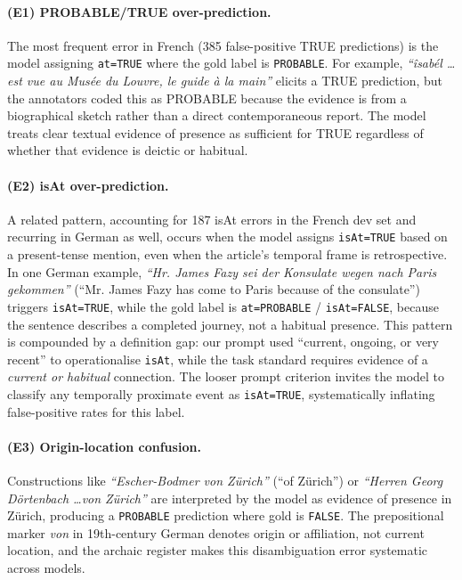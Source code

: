 \documentclass[
]{ceurart}
\theoremstyle{definition}
\begin{document}
\paragraph{(E1) PROBABLE/TRUE over-prediction.}
The most frequent error in French (385 false-positive TRUE predictions) is the model assigning \texttt{at=TRUE} where the gold label is \texttt{PROBABLE}.
For example, \textit{``îsabél \ldots est vue au Musée du Louvre, le guide à la main''} elicits a TRUE prediction, but the annotators coded this as PROBABLE because the evidence is from a biographical sketch rather than a direct contemporaneous report.
The model treats clear textual evidence of presence as sufficient for TRUE regardless of whether that evidence is deictic or habitual.

\paragraph{(E2) isAt over-prediction.}
A related pattern, accounting for 187 isAt errors in the French dev set and recurring in German as well, occurs when the model assigns \texttt{isAt=TRUE} based on a present-tense mention, even when the article's temporal frame is retrospective.
In one German example, \textit{``Hr. James Fazy sei der Konsulate wegen nach Paris gekommen''} (``Mr. James Fazy has come to Paris because of the consulate'') triggers \texttt{isAt=TRUE}, while the gold label is \texttt{at=PROBABLE} / \texttt{isAt=FALSE}, because the sentence describes a completed journey, not a habitual presence.
This pattern is compounded by a definition gap: our prompt used ``current, ongoing, or very recent'' to operationalise \texttt{isAt}, while the task standard requires evidence of a \emph{current or habitual} connection.
The looser prompt criterion invites the model to classify any temporally proximate event as \texttt{isAt=TRUE}, systematically inflating false-positive rates for this label.

\paragraph{(E3) Origin-location confusion.}
Constructions like \textit{``Escher-Bodmer von Zürich''} (``of Zürich'') or \textit{``Herren Georg Dörtenbach \ldots von Zürich''} are interpreted by the model as evidence of presence in Zürich, producing a \texttt{PROBABLE} prediction where gold is \texttt{FALSE}.
The prepositional marker \textit{von} in 19th-century German denotes origin or affiliation, not current location, and the archaic register makes this disambiguation error systematic across models.
\end{document}
